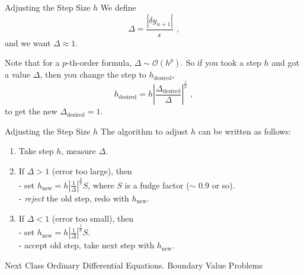 \documentclass[11pt]{beamer}
\begin{document}
\begin{frame}[fragile]{Adjusting the Step Size $h$}
We define 
\begin{equation}
\Delta = \frac{|\delta y_{n+1}|}{\epsilon}\,\,,
\end{equation}
and we want $\Delta \approx 1$.

Note that for a $p$-th-order formula, $\Delta \sim \mathcal{O}(h^p)$.
So if you took a step $h$ and got a value $\Delta$, then you change the step to $h_\text{desired}$,
\begin{equation}
h_\text{desired} = h \left|\frac{\Delta_\text{desired}}{\Delta} \right| ^\frac{1}{p}\,\,,
\end{equation}
to get the new  $\Delta_\text{desired} = 1$.
\end{frame}

\begin{frame}[fragile]{Adjusting the Step Size $h$}
The algorithm to adjust $h$ can be written as follows:
\begin{enumerate}
\item Take step $h$, measure $\Delta$.
\item If $\Delta > 1$ (error too large), then\\
  - set $h_\text{new} = h \left| \frac{1}{\Delta} \right|^{\frac{1}{p}} S$, where
  $S$ is a fudge factor ($\sim$ $0.9$ or so).\\
  - \emph{reject} the old step, redo with $h_\mathrm{new}$.
\item If $\Delta < 1$ (error too small), then\\
  - set $h_\text{new} = h \left| \frac{1}{\Delta} \right|^{\frac{1}{p}} S$.\\
  - accept old step, take next step with $h_\text{new}$.
\end{enumerate}
\end{frame}


\begin{frame}[fragile]{Next Class}
Ordinary Differential Equations. Boundary Value Problems
\end{frame}
\end{document}
